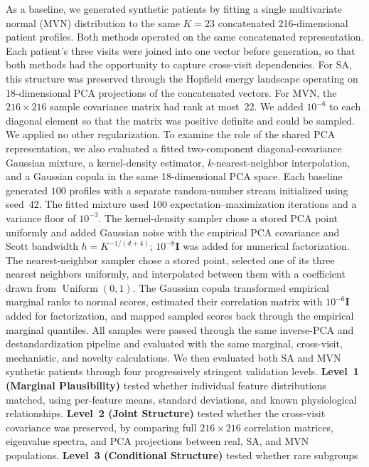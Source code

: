 As a baseline, we generated synthetic patients by fitting a single multivariate
normal (MVN) distribution to the same $K{=}23$ concatenated 216-dimensional patient
profiles. Both methods operated on the same concatenated
representation. Each patient's three visits were joined into one vector before
generation, so that both methods had the opportunity to capture cross-visit
dependencies. For SA, this structure was preserved through the Hopfield energy
landscape operating on 18-dimensional PCA projections of the concatenated vectors.
For MVN, the $216 \times 216$ sample covariance matrix had rank at most~22. We added
$10^{-6}$ to each diagonal element so that the matrix was positive definite and could be
sampled. We applied no other regularization.
To examine the role of the shared PCA representation, we also evaluated a fitted
two-component diagonal-covariance Gaussian mixture, a kernel-density estimator,
$k$-nearest-neighbor interpolation, and a Gaussian copula in the same 18-dimensional PCA
space. Each baseline generated $100$ profiles with a separate random-number stream initialized
using seed~42. The fitted mixture used $100$ expectation--maximization iterations and a
variance floor of $10^{-3}$. The kernel-density sampler chose a stored PCA point uniformly and
added Gaussian noise with the empirical PCA covariance and Scott bandwidth
$h=K^{-1/(d+4)}$; $10^{-8}\mathbf{I}$ was added for numerical factorization. The
nearest-neighbor sampler chose a stored point, selected one of its three nearest neighbors
uniformly, and interpolated between them with a coefficient drawn from
$\operatorname{Uniform}(0,1)$. The Gaussian copula transformed empirical marginal ranks to
normal scores, estimated their correlation matrix with $10^{-6}\mathbf{I}$ added for
factorization, and mapped sampled scores back through the empirical marginal quantiles. All
samples were passed through the same inverse-PCA and destandardization pipeline and evaluated
with the same marginal, cross-visit, mechanistic, and novelty calculations.
We then evaluated both SA and MVN synthetic patients through four progressively stringent
validation levels.
\textbf{Level~1 (Marginal Plausibility)} tested whether individual feature
distributions matched, using per-feature means, standard deviations, and known
physiological relationships. \textbf{Level~2 (Joint Structure)} tested whether the
cross-visit covariance was preserved, by comparing full $216 \times 216$ correlation
matrices, eigenvalue spectra, and PCA projections between real, SA, and MVN
populations. \textbf{Level~3 (Conditional Structure)} tested whether rare subgroups
